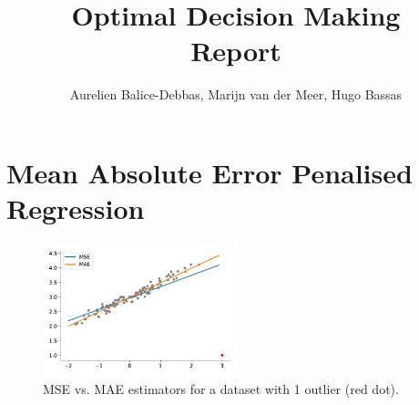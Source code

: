 \documentclass[10pt]{article}
\begin{document}
	
  \renewcommand{\qedsymbol}{\smiley}
	\title{Optimal Decision Making \\ Report}
	\author{Aurelien Balice-Debbas, Marijn van der Meer, Hugo Bassas}
	
	\maketitle

\section{Mean Absolute Error Penalised Regression}\label{sec:mae}

\begin{figure}[!ht]
  \centering
  \includegraphics[width=0.5\textwidth]{doc/images/im1_.png}
  \caption{MSE vs. MAE estimators for a dataset with 1 outlier (red dot). }
  \vspace{-3mm}
  \label{fig:mae-mse}
\end{figure}
\end{document}
